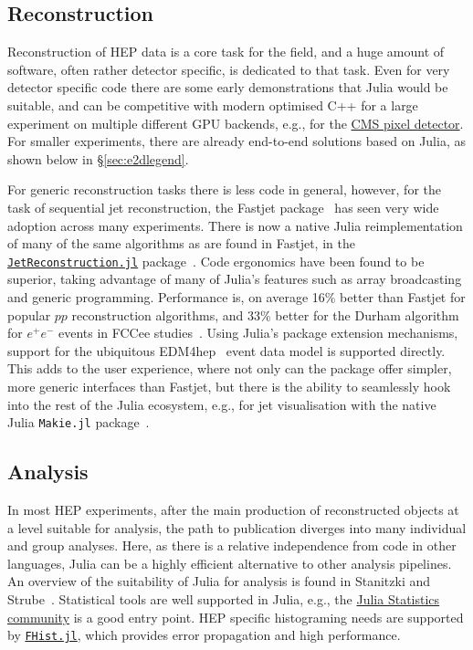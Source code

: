 \documentclass{webofc}
\begin{document}
\subsection{Reconstruction}

Reconstruction of HEP data is a core task for the field, and a huge amount of
software, often rather detector specific, is dedicated to that task. Even for
very detector specific code there are some early demonstrations that Julia would
be suitable, and can be competitive with modern optimised C++ for a large
experiment on multiple different GPU backends, e.g., for the \href{https://indico.cern.ch/event/1410341/contributions/6135572/}{CMS pixel
detector}. For smaller experiments, there are already
end-to-end solutions based on Julia, as shown below in
\S\ref{sec:e2dlegend}.

For generic reconstruction tasks there is less code in general, however, for the
task of sequential jet reconstruction, the Fastjet
package~\cite{Cacciari:2011ma} has seen very wide adoption across many
experiments. There is now a native Julia reimplementation of many of the same
algorithms as are found in Fastjet, in the
\href{https://doi.org/10.5281/zenodo.12671414}{\texttt{JetReconstruction.jl}}
package~\cite{polyglot-jets-chep23}. Code ergonomics have been found to be
superior, taking advantage of many of Julia's features such as array
broadcasting and generic programming. Performance is, on average 16\% better
than Fastjet for popular $pp$ reconstruction algorithms, and 33\% better for the
Durham algorithm for $e^+e^-$ events in FCCee
studies~\cite{fast-jet-reco-julia}. Using Julia's package extension mechanisms,
support for the ubiquitous EDM4hep~\cite{EDM4hep:2022leb} event data model is
supported directly. This adds to the user experience, where not only can the
package offer simpler, more generic interfaces than Fastjet, but there is the
ability to seamlessly hook into the rest of the Julia ecosystem, e.g., for jet
visualisation with the native Julia \texttt{Makie.jl}
package~\cite{Danisch2021}.

\subsection{Analysis}

In most HEP experiments, after the main production of reconstructed objects at a
level suitable for analysis, the path to publication diverges into many
individual and group analyses. Here, as there is a relative independence from
code in other languages, Julia can be a highly efficient alternative to other
analysis pipelines. An overview of the suitability of Julia for analysis is
found in Stanitzki and Strube~\cite{Stanitzki:2020bnx}. Statistical tools are
well supported in Julia, e.g., the \href{https://github.com/JuliaStats/}{Julia Statistics
community} is a good entry point. HEP
specific histograming needs are supported by
\href{https://github.com/Moelf/FHist.jl/}{\texttt{FHist.jl}}, which provides error
propagation and high performance.
\end{document}
